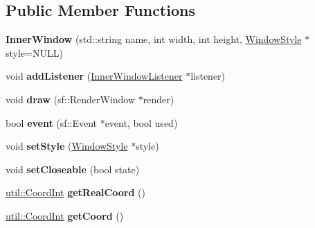 \subsection*{Public Member Functions}
\begin{DoxyCompactItemize}
\item 
\hypertarget{classgraphics_1_1_inner_window_af7e7c8920d51362ae064be6a5ab83f93}{{\bfseries Inner\-Window} (std\-::string name, int width, int height, \hyperlink{classgraphics_1_1_window_style}{Window\-Style} $\ast$style=N\-U\-L\-L)}\label{classgraphics_1_1_inner_window_af7e7c8920d51362ae064be6a5ab83f93}

\item 
\hypertarget{classgraphics_1_1_inner_window_aaf80725529919c3ef973a4748c1e27b2}{void {\bfseries add\-Listener} (\hyperlink{classgraphics_1_1_inner_window_listener}{Inner\-Window\-Listener} $\ast$listener)}\label{classgraphics_1_1_inner_window_aaf80725529919c3ef973a4748c1e27b2}

\item 
\hypertarget{classgraphics_1_1_inner_window_aa0ae1550f541d1e76374c11819a08b49}{void {\bfseries draw} (sf\-::\-Render\-Window $\ast$render)}\label{classgraphics_1_1_inner_window_aa0ae1550f541d1e76374c11819a08b49}

\item 
\hypertarget{classgraphics_1_1_inner_window_a07a5c9840cac93f78fbfc1c090ddeeb0}{bool {\bfseries event} (sf\-::\-Event $\ast$event, bool used)}\label{classgraphics_1_1_inner_window_a07a5c9840cac93f78fbfc1c090ddeeb0}

\item 
\hypertarget{classgraphics_1_1_inner_window_aa2f4247da24170c17509dd8807450a0b}{void {\bfseries set\-Style} (\hyperlink{classgraphics_1_1_window_style}{Window\-Style} $\ast$style)}\label{classgraphics_1_1_inner_window_aa2f4247da24170c17509dd8807450a0b}

\item 
\hypertarget{classgraphics_1_1_inner_window_ac6b01f953c8399c2819c8060af3dd31a}{void {\bfseries set\-Closeable} (bool state)}\label{classgraphics_1_1_inner_window_ac6b01f953c8399c2819c8060af3dd31a}

\item 
\hypertarget{classgraphics_1_1_inner_window_a97b170e16c9c2ac2b22bb9a11c8063b6}{\hyperlink{classutil_1_1_coordinates}{util\-::\-Coord\-Int} {\bfseries get\-Real\-Coord} ()}\label{classgraphics_1_1_inner_window_a97b170e16c9c2ac2b22bb9a11c8063b6}

\item 
\hypertarget{classgraphics_1_1_inner_window_abdc5dda4a023707d51c8128393a96be7}{\hyperlink{classutil_1_1_coordinates}{util\-::\-Coord\-Int} {\bfseries get\-Coord} ()}\label{classgraphics_1_1_inner_window_abdc5dda4a023707d51c8128393a96be7}


\end{DoxyCompactItemize}
